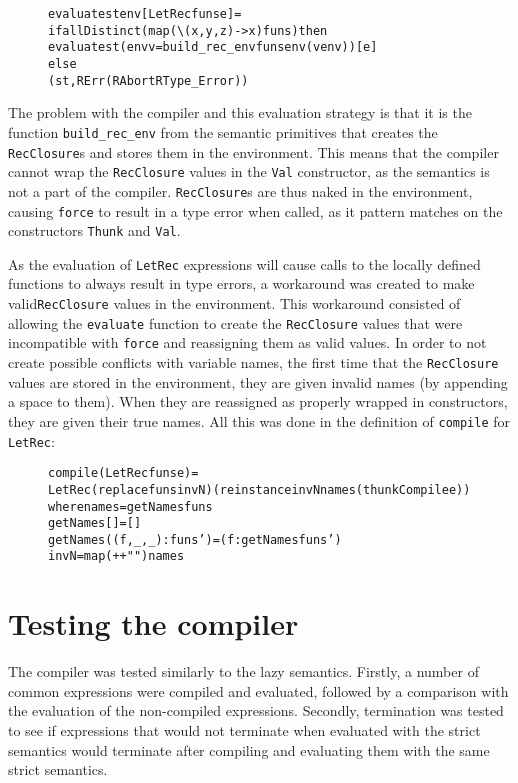\begin{figure}[H]
\begin{alltt}
  evaluate st env [LetRec funs e] =
    if allDistinct (map (\textbackslash(x,y,z) -> x) funs) then
      evaluate st (env {v = build_rec_env funs env (v env)}) [e]
    else
      (st, RErr (RAbort RType_Error))
\end{alltt}
\end{figure}

\noindent The problem with the compiler and this evaluation strategy is that it
is the function \texttt{build\_rec\_env} from the semantic primitives that
creates the \texttt{RecClosure}s and stores them in the environment. This means
that the compiler cannot wrap the \texttt{RecClosure} values in the
\texttt{Val} constructor, as the semantics is not a part of the compiler.
\texttt{RecClosure}s are thus naked in the environment, causing \texttt{force}
to result in a type error when called, as it pattern matches on the constructors
\texttt{Thunk} and \texttt{Val}.

As the evaluation of \texttt{LetRec} expressions will cause calls to the locally
defined functions to always result in type errors, a workaround was created to
make valid\texttt{RecClosure} values in the environment. This workaround
consisted of allowing the \texttt{evaluate} function to create the
\texttt{RecClosure} values that were incompatible with \texttt{force} and
reassigning them as valid values. In order to not create possible conflicts
with variable names, the first time that the \texttt{RecClosure} values are
stored in the environment, they are given invalid names (by appending a space
to them). When they are reassigned as properly wrapped in constructors, they
are given their true names. All this was done in the definition of
\texttt{compile} for \texttt{LetRec}:

\begin{figure}[H]
\begin{alltt}
  compile (LetRec funs e) =
    LetRec (replace funs invN) (reinstance invN names (thunkCompile e))
    where names = getNames funs
          getNames [] = []
          getNames ((f,_,_):funs') = (f:getNames funs')
          invN = map (++ " ") names
\end{alltt}
\end{figure}

\section{Testing the compiler}
\label{compiler:test}
The compiler was tested similarly to the lazy semantics. Firstly, a number of
common expressions were compiled and evaluated, followed by a comparison with
the evaluation of the non-compiled expressions. Secondly, termination was tested
to see if expressions that would not terminate when evaluated with the strict
semantics would terminate after compiling and evaluating them with the same
strict semantics.

